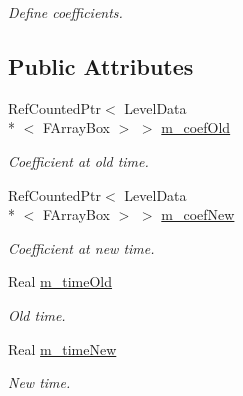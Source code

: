 \begin{DoxyCompactItemize}
\begin{DoxyCompactList}\small\item\em Define coefficients. \end{DoxyCompactList}\end{DoxyCompactItemize}
\subsection*{Public Attributes}
\begin{DoxyCompactItemize}
\item 
\hypertarget{class_coefficient_interpolator_linear_a4f859c7c7aa5fefe581e70b641c2c7cd}{Ref\-Counted\-Ptr$<$ Level\-Data\\*
$<$ F\-Array\-Box $>$ $>$ \hyperlink{class_coefficient_interpolator_linear_a4f859c7c7aa5fefe581e70b641c2c7cd}{m\-\_\-coef\-Old}}\label{class_coefficient_interpolator_linear_a4f859c7c7aa5fefe581e70b641c2c7cd}

\begin{DoxyCompactList}\small\item\em Coefficient at old time. \end{DoxyCompactList}\item 
\hypertarget{class_coefficient_interpolator_linear_ab139ee5bd26c87a907242072d79080e2}{Ref\-Counted\-Ptr$<$ Level\-Data\\*
$<$ F\-Array\-Box $>$ $>$ \hyperlink{class_coefficient_interpolator_linear_ab139ee5bd26c87a907242072d79080e2}{m\-\_\-coef\-New}}\label{class_coefficient_interpolator_linear_ab139ee5bd26c87a907242072d79080e2}

\begin{DoxyCompactList}\small\item\em Coefficient at new time. \end{DoxyCompactList}\item 
\hypertarget{class_coefficient_interpolator_linear_a2ab6b22fe2ae4b4a67c2b2e8939a7725}{Real \hyperlink{class_coefficient_interpolator_linear_a2ab6b22fe2ae4b4a67c2b2e8939a7725}{m\-\_\-time\-Old}}\label{class_coefficient_interpolator_linear_a2ab6b22fe2ae4b4a67c2b2e8939a7725}

\begin{DoxyCompactList}\small\item\em Old time. \end{DoxyCompactList}\item 
\hypertarget{class_coefficient_interpolator_linear_a6202c9344b2886cf3a951e8aed4c9dbd}{Real \hyperlink{class_coefficient_interpolator_linear_a6202c9344b2886cf3a951e8aed4c9dbd}{m\-\_\-time\-New}}\label{class_coefficient_interpolator_linear_a6202c9344b2886cf3a951e8aed4c9dbd}

\begin{DoxyCompactList}\small\item\em New time. \end{DoxyCompactList}\end{DoxyCompactItemize}


